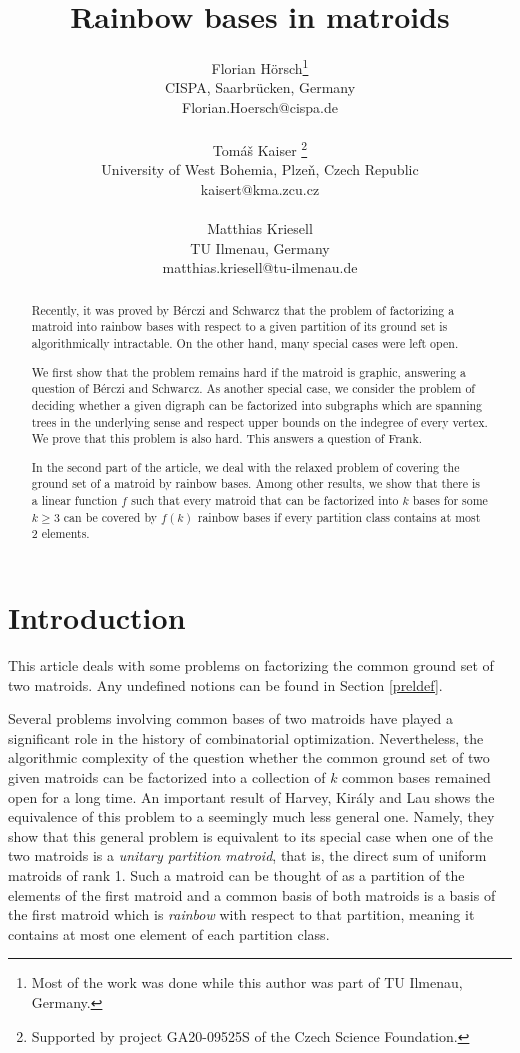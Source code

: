 \documentclass{article}
\title{Rainbow bases in matroids}
\author{Florian H\"orsch\footnote{ Most of the work was done while this author was part of TU Ilmenau, Germany.}\\ CISPA, Saarbrücken, Germany \\ Florian.Hoersch@cispa.de\\
\bigskip 

Tom\'a\v{s} Kaiser  \footnote{ Supported
by project GA20-09525S of the Czech Science Foundation.}\\ University of West Bohemia, Plze\v{n}, Czech Republic \\ kaisert@kma.zcu.cz\\ 

\bigskip 


Matthias Kriesell \\ TU Ilmenau,  Germany \\ matthias.kriesell@tu-ilmenau.de}
\begin{document}
\maketitle

\begin{abstract}
Recently, it was proved by B\'erczi and Schwarcz that  the problem of factorizing a matroid into rainbow bases with respect to a given partition of its ground set is algorithmically intractable. On the other hand, many special cases were left open.

We first show that the problem remains hard if the matroid is graphic, answering a question of  B\'erczi and Schwarcz. As another special case, we consider the problem of deciding whether a given digraph can be factorized into subgraphs which are spanning trees in the underlying sense and respect upper bounds on the indegree of every vertex. We prove that this problem is also hard. This answers a question of Frank.

In the second part of the article, we deal with the relaxed problem of covering the ground set of a matroid by rainbow bases. Among other results, we show that there is a linear function $f$ such that every matroid that can be factorized into $k$ bases for some $k \geq 3$ can be covered by $f(k)$ rainbow bases if every partition class contains at most 2 elements.
\end{abstract}%
\section{Introduction}
This article deals with some problems on factorizing the common ground set of two matroids. Any undefined notions can be found in Section \ref{preldef}.


Several problems involving common bases of two matroids have played a significant role in the history of combinatorial optimization. Nevertheless, the algorithmic complexity of the question whether the common ground set of two given matroids can be factorized into a collection of $k$ common bases remained open for a long time. An important result of Harvey, Kir\'aly and Lau \cite{hkl} shows the equivalence of this problem to a seemingly much less general one. Namely, they show that this general problem is equivalent to its special case when one of the two matroids is a {\it unitary partition matroid}, that  is, the direct sum of uniform matroids of rank 1. Such a matroid can be thought of as a partition of the elements of the first matroid and a common basis of both matroids is a basis of the first matroid which is {\it rainbow} with respect to that partition, meaning it contains at most one element of each partition class.
\end{document}
